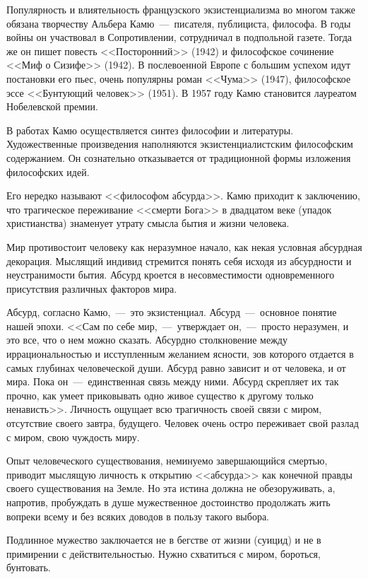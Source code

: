 \documentclass{bmstu}
\begin{document}
Популярность и влиятельность французского экзистенциализма во многом также обязана творчеству Альбера Камю~---~писателя, публициста, философа. В годы войны он участвовал в Сопротивлении, сотрудничал в подпольной газете. Тогда же он пишет повесть <<Посторонний>> (1942) и философское сочинение <<Миф о Сизифе>> (1942). В послевоенной Европе с большим успехом идут постановки его пьес, очень популярны роман <<Чума>> (1947), философское эссе <<Бунтующий человек>> (1951). В 1957 году Камю становится лауреатом Нобелевской премии.

В работах Камю осуществляется синтез философии и литературы. Художественные произведения наполняются экзистенциалистским философским содержанием. Он сознательно отказывается от традиционной формы изложения философских идей.

Его нередко называют <<философом абсурда>>. Камю приходит к заключению, что трагическое переживание <<смерти Бога>> в двадцатом веке (упадок христианства) знаменует утрату смысла бытия и жизни человека.

Мир противостоит человеку как неразумное начало, как некая условная абсурдная декорация. Мыслящий индивид стремится понять себя исходя из абсурдности и неустранимости бытия. Абсурд кроется в несовместимости одновременного присутствия различных факторов мира.

Абсурд, согласно Камю,~---~это экзистенциал. Абсурд~---~основное понятие нашей эпохи. <<Сам по себе мир,~---~утверждает он,~---~просто неразумен, и это все, что о нем можно сказать. Абсурдно столкновение между иррациональностью и исступленным желанием ясности, зов которого отдается в самых глубинах человеческой души. Абсурд равно зависит и от человека, и от мира. Пока он~---~единственная связь между ними. Абсурд скрепляет их так прочно, как умеет приковывать одно живое существо к другому только ненависть>>. Личность ощущает всю трагичность своей связи с миром, отсутствие своего завтра, будущего. Человек очень остро переживает свой разлад с миром, свою чуждость миру.

Опыт человеческого существования, неминуемо завершающийся смертью, приводит мыслящую личность к открытию <<абсурда>> как конечной правды своего существования на Земле. Но эта истина должна не обезоруживать, а, напротив, пробуждать в душе мужественное достоинство продолжать жить вопреки всему и без всяких доводов в пользу такого выбора.

Подлинное мужество заключается не в бегстве от жизни (суицид) и не в примирении с действительностью. Нужно схватиться с миром, бороться, бунтовать.
\end{document}
